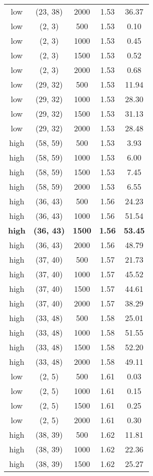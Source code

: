 \begin{tabular}{c c c c c}
low & (23, 38) &  2000 & 1.53 & 36.37 \\
low & (2, 3) &  500 & 1.53 & 0.10 \\
low & (2, 3) &  1000 & 1.53 & 0.45 \\
low & (2, 3) &  1500 & 1.53 & 0.52 \\
low & (2, 3) &  2000 & 1.53 & 0.68 \\
low & (29, 32) &  500 & 1.53 & 11.94 \\
low & (29, 32) &  1000 & 1.53 & 28.30 \\
low & (29, 32) &  1500 & 1.53 & 31.13 \\
low & (29, 32) &  2000 & 1.53 & 28.48 \\
high & (58, 59) &  500 & 1.53 & 3.93 \\
high & (58, 59) &  1000 & 1.53 & 6.00 \\
high & (58, 59) &  1500 & 1.53 & 7.45 \\
high & (58, 59) &  2000 & 1.53 & 6.55 \\
high & (36, 43) &  500 & 1.56 & 24.23 \\
high & (36, 43) &  1000 & 1.56 & 51.54 \\
\textbf{high} & \textbf{(36, 43)} & \textbf{ 1500} & \textbf{1.56} & \textbf{53.45} \\
high & (36, 43) &  2000 & 1.56 & 48.79 \\
high & (37, 40) &  500 & 1.57 & 21.73 \\
high & (37, 40) &  1000 & 1.57 & 45.52 \\
high & (37, 40) &  1500 & 1.57 & 44.61 \\
high & (37, 40) &  2000 & 1.57 & 38.29 \\
high & (33, 48) &  500 & 1.58 & 25.01 \\
high & (33, 48) &  1000 & 1.58 & 51.55 \\
high & (33, 48) &  1500 & 1.58 & 52.20 \\
high & (33, 48) &  2000 & 1.58 & 49.11 \\
low & (2, 5) &  500 & 1.61 & 0.03 \\
low & (2, 5) &  1000 & 1.61 & 0.15 \\
low & (2, 5) &  1500 & 1.61 & 0.25 \\
low & (2, 5) &  2000 & 1.61 & 0.30 \\
high & (38, 39) &  500 & 1.62 & 11.81 \\
high & (38, 39) &  1000 & 1.62 & 22.36 \\
high & (38, 39) &  1500 & 1.62 & 25.27 \\

\end{tabular}
